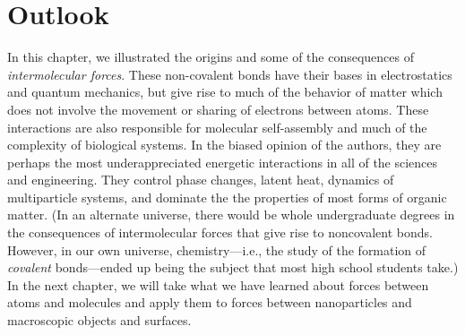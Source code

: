 \section{Outlook}

In this chapter, we illustrated the origins and some of the consequences of \textit{intermolecular forces}. These non-covalent bonds have their bases in electrostatics and quantum mechanics, but give rise to much of the behavior of matter which does not involve the movement or sharing of electrons between atoms. These interactions are also responsible for molecular self-assembly and much of the complexity of biological systems. In the biased opinion of the authors, they are perhaps the most underappreciated energetic interactions in all of the sciences and engineering. They control phase changes, latent heat, dynamics of multiparticle systems, and dominate the the properties of most forms of organic matter. (In an alternate universe, there would be whole undergraduate degrees in the consequences of intermolecular forces that give rise to noncovalent bonds. However, in our own universe, chemistry---i.e., the study of the formation of \textit{covalent} bonds---ended up being the subject that most high school students take.) In the next chapter, we will take what we have learned about  forces between atoms and molecules and apply them to forces between nanoparticles and macroscopic objects and surfaces.

